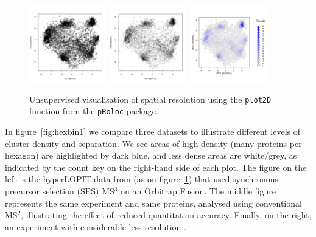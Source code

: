 \documentclass[12pt]{article}\usepackage[]{graphicx}\usepackage[]{color}
\newcommand{\Rpackage}[1]{\texttt{#1}}
\newcommand\Biocpkg[1]{%
  {\href{http://bioconductor.org/packages/#1}%
    {\Rpackage{#1}}}}
\begin{document}
\begin{figure}[ht]
  \centering
  \includegraphics[width = 0.3\textwidth]{./figure/density-1.pdf}
  \includegraphics[width = 0.3\textwidth]{./figure/density-2.pdf}
  \includegraphics[width = 0.3\textwidth]{./figure/density-3.pdf}
  \caption{Unsupervised visualisation of spatial resolution using the
    \texttt{plot2D} function from the \Biocpkg{pRoloc} package. }
  \label{fig:density}
\end{figure}



In figure~\ref{fig:hexbin1} we compare three datasets to illustrate
different levels of cluster density and separation. We see
areas of high density (many proteins per hexagon)
are highlighted by dark blue, and less
dense areas are white/grey, as indicated by the count key on
the right-hand side of each plot. The figure on the
left is the hyperLOPIT data from \citet{Christoforou:2016} (as on
figure~\ref{fig:density}) that used synchronous precursor selection
(SPS) MS$^3$ on an Orbitrap Fusion. The middle figure represents the
same experiment and same proteins, analysed using conventional MS$^2$,
illustrating the effect of reduced quantitation accuracy. Finally, on
the right, an experiment with considerable less resolution
\citep{Hall:2009}.
\end{document}
